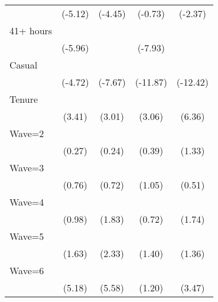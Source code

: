 {\begin{tabular}{l*{4}{c}}
                    &     (-5.12)         &     (-4.45)         &     (-0.73)         &     (-2.37)         \\
[1em]
41+ hours           &            \sym{***}&                     &            \sym{***}&                     \\
                    &     (-5.96)         &                     &     (-7.93)         &                     \\
[1em]
Casual              &            \sym{***}&            \sym{***}&            \sym{***}&            \sym{***}\\
                    &     (-4.72)         &     (-7.67)         &    (-11.87)         &    (-12.42)         \\
[1em]
Tenure              &            \sym{***}&            \sym{**} &            \sym{**} &            \sym{***}\\
                    &      (3.41)         &      (3.01)         &      (3.06)         &      (6.36)         \\
[1em]
Wave=2              &                     &                     &                     &                     \\
                    &      (0.27)         &      (0.24)         &      (0.39)         &      (1.33)         \\
[1em]
Wave=3              &                     &                     &                     &                     \\
                    &      (0.76)         &      (0.72)         &      (1.05)         &      (0.51)         \\
[1em]
Wave=4              &                     &                     &                     &                     \\
                    &      (0.98)         &      (1.83)         &      (0.72)         &      (1.74)         \\
[1em]
Wave=5              &                     &            \sym{*}  &                     &                     \\
                    &      (1.63)         &      (2.33)         &      (1.40)         &      (1.36)         \\
[1em]
Wave=6              &            \sym{***}&            \sym{***}&                     &            \sym{***}\\
                    &      (5.18)         &      (5.58)         &      (1.20)         &      (3.47)         \\

\end{tabular}}
